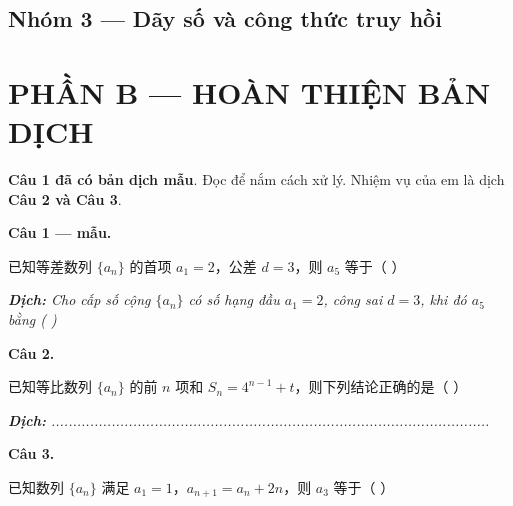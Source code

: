\documentclass[11pt, a4paper]{article}
\begin{document}
\subsection{Nhóm 3 — Dãy số và công thức truy hồi}


\section{PHẦN B — HOÀN THIỆN BẢN DỊCH}

\textbf{Câu 1 đã có bản dịch mẫu}. Đọc để nắm cách xử lý. Nhiệm vụ của em là dịch \textbf{Câu 2 và Câu 3}.

\textbf{Câu 1 — mẫu.}

已知等差数列 $\{a_n\}$ 的首项 $a_1 = 2$，公差 $d = 3$，则 $a_5$ 等于（ ）

\noindent\emph{\textbf{Dịch:} Cho cấp số cộng $\{a_n\}$ có số hạng đầu $a_1 = 2$, công sai $d = 3$, khi đó $a_5$ bằng ( )}

\textbf{Câu 2.}

已知等比数列 $\{a_n\}$ 的前 $n$ 项和 $S_n = 4^{n-1} + t$，则下列结论正确的是（ ）

\noindent\emph{\textbf{Dịch:} ......................................................................................................}

\textbf{Câu 3.}

已知数列 $\{a_n\}$ 满足 $a_1 = 1$，$a_{n+1} = a_n + 2n$，则 $a_3$ 等于（ ）
\end{document}

